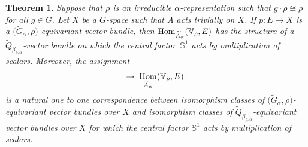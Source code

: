 \documentclass[11pt]{article}
\numberwithin{equation}{section}
\def\S{\mathbb{S}}
\def\V{\mathbb{V}}
\DeclareMathOperator{\Hom}{\textup{Hom}}
\newtheorem{Th}{Theorem}[section]
\theoremstyle{definition}
\numberwithin{equation}{section}
\begin{document}
\begin{Th}\label{teo,bij}
Suppose that $\rho$ is an irreducible $\alpha$-representation such that $g\cdot\rho\cong\rho$
for all $g \in G$. Let $X$ be a $G$-space such that $A$ acts trivially on $X$.
If $p\colon E\rightarrow X$ is a $\big(\widetilde{G}_{\alpha}, \rho\big)$-equivariant vector bundle, then
$\Hom_{\widetilde{A}_{\alpha}}(\V_{\rho},E)$ has the
structure of a $\widetilde{Q}_{\beta_{\rho,\alpha}}$-vector bundle on which
the central factor~$\S^{1}$ acts by multiplication of
scalars. Moreover, the assignment
\begin{gather*}
[E]\rightarrow
[\Hom_{\widetilde{A}_{\alpha}}(\V_{\rho},E)]
\end{gather*}
is a natural one to one correspondence between isomorphism
classes of $\big(\widetilde{G}_{\alpha},\rho\big)$-equivariant
vector bundles over $X$ and isomorphism classes of
$\widetilde{Q}_{\beta_{\rho,\alpha}}$-equivariant vector bundles over $X$
for which the central factor $\S^{1}$ acts by multiplication of scalars.
\end{Th}
\end{document}
